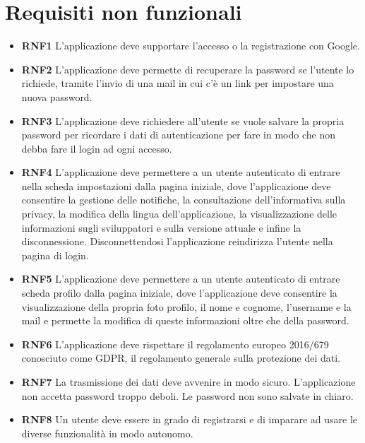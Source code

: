 \documentclass[a4paper,12pt]{article}
\begin{document}
\section*{Requisiti non funzionali}
\begin{itemize} \setlength\itemsep{0.01em}

\item \textbf {\hypertarget{RNF1}{RNF1}}  L'applicazione deve supportare l'accesso o la registrazione con Google.
\item \textbf {\hypertarget{RNF2}{RNF2}}  L'applicazione deve permette di recuperare la password se l'utente lo richiede, tramite l'invio di una mail in cui c'è un link per impostare una nuova password.
\item \textbf {\hypertarget{RNF3}{RNF3}}  L'applicazione deve richiedere all'utente se vuole salvare la propria password per ricordare i dati di autenticazione per fare in modo che non debba fare il login ad ogni accesso.
\item \textbf {\hypertarget{RNF4}{RNF4}}  L'applicazione deve permettere a un utente autenticato di entrare nella scheda impostazioni dalla pagina iniziale, dove l'applicazione deve consentire la gestione delle notifiche, la consultazione dell'informativa sulla privacy, la modifica della lingua dell'applicazione, la visualizzazione delle informazioni sugli sviluppatori e sulla versione attuale e infine la disconnessione. Disconnettendosi l'applicazione reindirizza l'utente nella pagina di login.
\item \textbf {\hypertarget{RNF5}{RNF5}}  L'applicazione deve permettere a un utente autenticato di entrare scheda profilo dalla pagina iniziale, dove l'applicazione deve consentire la visualizzazione della propria foto profilo, il nome e cognome, l'username e la mail e permette la modifica di queste informazioni oltre che della password.
\item \textbf {\hypertarget{RNF6}{RNF6} } L'applicazione deve rispettare il regolamento europeo 2016/679 conosciuto come GDPR, il regolamento generale sulla protezione dei dati.
\item \textbf {\hypertarget{RNF7}{RNF7}} 
La trasmissione dei dati deve avvenire in modo sicuro.
L'applicazione non accetta password troppo deboli.
Le password non sono salvate in chiaro.
\item \textbf {\hypertarget{RNF8}{RNF8}} Un utente deve essere in grado di registrarsi e di imparare ad usare le diverse funzionalità in modo autonomo.

\end{itemize}
\newpage
\end{document}
